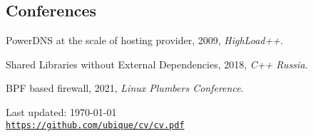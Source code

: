 \documentclass[letterpaper]{article}
\def\footerlink{https://github.com/ubique/cv/cv.pdf}
\renewenvironment{itemize}{
  \begin{list}{}{
    \setlength{\leftmargin}{1.5em}
  }
}{
  \end{list}
}
\begin{document}
\subsection*{Conferences}

\begin{itemize}
\item PowerDNS at the scale of hosting provider, 2009, {\it HighLoad++}.
\item Shared Libraries without External Dependencies, 2018, {\it C++ Russia}.
\item BPF based firewall, 2021, {\it Linux Plumbers Conference}.
\end{itemize}

\bigskip

\begin{center}
  \begin{footnotesize}
    Last updated: \today \\
    \href{\footerlink}{\texttt{\footerlink}}
  \end{footnotesize}
\end{center}
\end{document}
